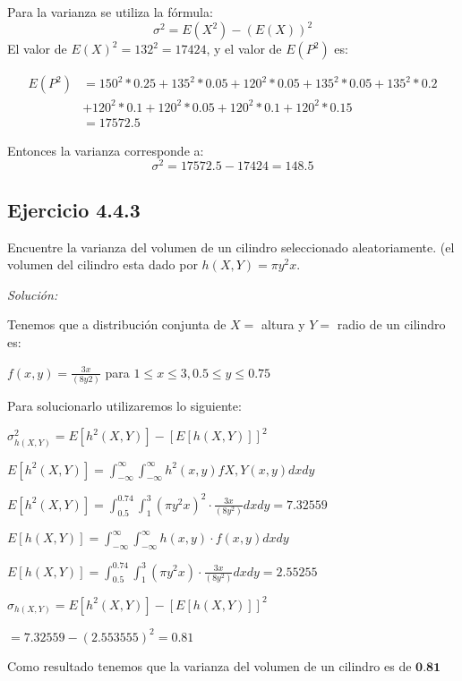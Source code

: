 \documentclass{article}\usepackage[]{graphicx}\usepackage[]{color}
\begin{document}
Para la varianza se utiliza la fórmula:
\[\sigma^{2} = E(X^{2})-(E(X))^{2}\]
El valor de $E(X)^{2} = 132^{2} = 17424$, y el valor de $E(P^{2})$ es:

\begin{align*}
E(P^{2}) &= 150^{2}*0.25+135^{2}*0.05+120^{2}*0.05+135^{2}*0.05+135^{2}*0.2\\&+120^{2}*0.1+120^{2}*0.05+120^{2}*0.1+120^{2}*0.15\\
&= 17572.5
\end{align*}

Entonces la varianza corresponde a: 
\[\sigma^{2} = 17572.5-17424 = 148.5\]



\subsection{Ejercicio 4.4.3}
\begin{enumerate}
    \item Encuentre la varianza del volumen de un cilindro seleccionado aleatoriamente. (el volumen del cilindro esta dado por $h(X,Y) = \pi y^{2}x$. 

\textit{Solución:}

Tenemos que a distribución conjunta de $X =$ altura y $Y =$ radio de un cilindro es: 


\begin{center}

\item $f(x,y)= \frac{3x}{(8y2)}$ para $1\leq x \leq 3, 0.5 \leq  y \leq  0.75$

\end{center}

Para solucionarlo utilizaremos lo siguiente:

\begin{center}

$\sigma_{h(X,Y)}^{2}= E[h^{2}(X,Y)]-[E[h(X,Y)]]^{2}$

$E[h^{2}(X,Y)]= \int_{-\infty }^{\infty } \int_{-\infty }^{\infty } h^{2}(x,y)fX,Y(x,y)dx dy$

$E[h^{2}(X,Y)]=\int_{0.5}^{0.74} \int_{1}^{3}(\pi y^{2}x)^{2} \cdot \frac{3x}{(8y^{2})}dxdy=7.32559$

$E[h(X,Y)]= \int_{-\infty }^{\infty } \int_{-\infty }^{\infty } h(x,y)\cdot f(x,y)dx dy$

$E[h(X,Y)]=\int_{0.5}^{0.74} \int_{1}^{3}(\pi y^{2}x)\cdot \frac{3x}{(8y^{2})}dxdy=2.55255$

$\sigma_{h(X,Y)}= E[h^{2}(X,Y)]-[E[h(X,Y)]]^{2}$

$= 7.32559 -(2.553555)^{2}= 0.81$
\end{center}
Como resultado tenemos que la varianza del volumen de un cilindro es de $\textbf{0.81}$

\end{enumerate}
\end{document}
